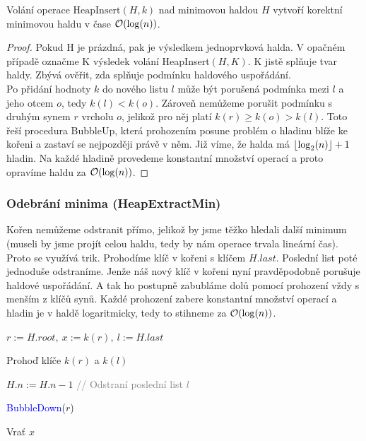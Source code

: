 \begin{lemma}
Volání operace $\text{HeapInsert}(H, k)$ nad minimovou haldou $H$ vytvoří korektní minimovou haldu v čase $\mathcal{O}(\log (n))$.
\end{lemma}

\begin{proof}
Pokud H je prázdná, pak je výsledkem jednoprvková halda. V opačném případě označme K výsledek volání HeapInsert$(H, K)$. K jistě splňuje tvar haldy. Zbývá ověřit, zda splňuje podmínku haldového uspořádání. \\
Po přidání hodnoty $k$ do nového listu $l$ může být porušená podmínka mezi $l$ a jeho otcem $o$, tedy $k(l) < k(o)$. Zároveň nemůžeme porušit podmínku s druhým synem $r$ vrcholu $o$, jelikož pro něj platí $k(r) \geq k(o) > k(l)$. Toto řeší procedura BubbleUp, která prohozením posune problém o hladinu blíže ke kořeni a zastaví se nejpozději právě v něm. Již víme, že halda má $\left\lfloor\log_2(n)\right\rfloor + 1$ hladin. Na každé hladině provedeme konstantní množství operací a proto opravíme haldu za $\mathcal{O}(\log(n))$.
\end{proof}

\newpage

\subsubsection{Odebrání minima (HeapExtractMin)}
Kořen nemůžeme odstranit přímo, jelikož by jsme těžko hledali další minimum (museli by jsme projít celou haldu, tedy by nám operace trvala lineární čas). Proto se využívá trik. Prohodíme klíč v kořeni s klíčem $H.last$. Poslední list poté jednoduše odstraníme. Jenže náš nový klíč v kořeni nyní pravděpodobně porušuje haldové uspořádání. A tak ho postupně zabubláme dolů pomocí prohození vždy s menším z klíčů synů. Každé prohození zabere konstantní množství operací a hladin je v haldě logaritmicky, tedy to stihneme za $\mathcal{O}(\log(n))$.\bigskip

\begin{pseudocode}
\item $r := H.root,\ x := k(r),\ l := H.last$
\item Prohoď klíče $k(r)$ a $k(l)$
\item $H.n := H.n - 1$ \hfill \textcolor{gray}{// Odstraní poslední list $l$}
\item \textcolor{blue}{BubbleDown}($r$)
\item Vrať $x$
\end{pseudocode} \bigskip

